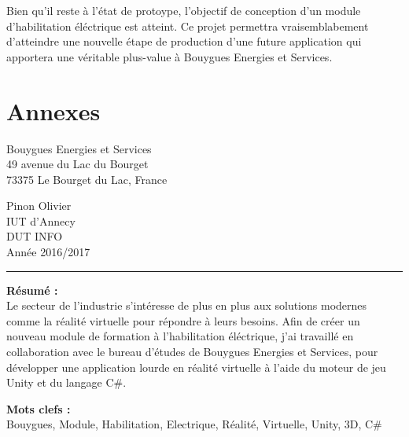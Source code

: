 \documentclass[a4paper]{article}
\begin{document}
    Bien qu'il reste à l'état de protoype, l'objectif de conception d'un module d'habilitation éléctrique est atteint. Ce projet permettra vraisemblabement d'atteindre une nouvelle étape de production d'une future application qui apportera une véritable plus-value à Bouygues Energies et Services.

    \section{Annexes}
    
    \newpage 
    \normalsize
    \thispagestyle{empty}
    \noindent
    \begin{minipage}{.5\textwidth}
        Bouygues Energies et Services \\
        49 avenue du Lac du Bourget \\
        73375 Le Bourget du Lac, France
    \end{minipage}
    \begin{minipage}{.5\textwidth}
    \begin{flushright}
        Pinon Olivier \\
        IUT d'Annecy \\
        DUT INFO \\
        Année 2016/2017 \\
    \end{flushright}
    \end{minipage}

    \vspace{10pt}
    \noindent\rule{0.725\paperwidth}{0.4pt}
    
    \vfill 
    \begin{flushleft}
    \huge \textbf{Résumé : } \\
    \vspace{10pt}
    \normalsize Le secteur de l'industrie s'intéresse de plus en plus aux solutions modernes comme la réalité virtuelle pour répondre à leurs besoins. Afin de créer un nouveau module de formation à l'habilitation éléctrique, j'ai travaillé en collaboration avec le bureau d'études de Bouygues Energies et Services, pour développer une application lourde en réalité virtuelle à l'aide du moteur de jeu Unity et du langage C\#. \\
    \end{flushleft}
    
    \vfill 
    \begin{flushleft}
    \huge \textbf{Mots clefs : } \vspace{2pt} \\
    \vspace{10pt}
    \normalsize Bouygues, Module, Habilitation, Electrique, Réalité, Virtuelle, Unity, 3D, C\#
    \end{flushleft}
\end{document}
